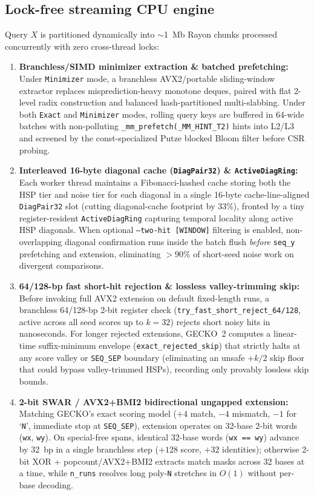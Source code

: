 \documentclass[pdflatex,sn-vancouver,Numbered]{sn-jnl}
\begin{document}
\subsection{Lock-free streaming CPU engine}\label{subsec:cpu}

Query $X$ is partitioned dynamically into $\sim$1~Mb Rayon chunks processed concurrently with zero cross-thread locks:
\begin{enumerate}
    \item \textbf{Branchless/SIMD minimizer extraction \& batched prefetching:} Under \texttt{Minimizer} mode, a branchless AVX2/portable sliding-window extractor replaces misprediction-heavy monotone deques, paired with flat 2-level radix construction and balanced hash-partitioned multi-slabbing. Under both \texttt{Exact} and \texttt{Minimizer} modes, rolling query keys are buffered in 64-wide batches with non-polluting \texttt{\_mm\_prefetch(\_MM\_HINT\_T2)} hints into L2/L3 and screened by the const-specialized Putze blocked Bloom filter before CSR probing.
    \item \textbf{Interleaved 16-byte diagonal cache (\texttt{DiagPair32}) \& \texttt{ActiveDiagRing}:} Each worker thread maintains a Fibonacci-hashed cache storing both the HSP tier and noise tier for each diagonal in a single 16-byte cache-line-aligned \texttt{DiagPair32} slot (cutting diagonal-cache footprint by 33\%), fronted by a tiny register-resident \texttt{ActiveDiagRing} capturing temporal locality along active HSP diagonals. When optional \texttt{--two-hit [WINDOW]} filtering \cite{altschul1997gappedblast} is enabled, non-overlapping diagonal confirmation runs inside the batch flush \emph{before} \texttt{seq\_y} prefetching and extension, eliminating $>90\%$ of short-seed noise work on divergent comparisons.
    \item \textbf{64/128-bp fast short-hit rejection \& lossless valley-trimming skip:} Before invoking full AVX2 extension on default fixed-length runs, a branchless 64/128-bp 2-bit register check (\texttt{try\_fast\_short\_reject\_64/128}, active across all seed scores up to $k=32$) rejects short noisy hits in nanoseconds. For longer rejected extensions, GECKO~2 computes a linear-time suffix-minimum envelope (\texttt{exact\_rejected\_skip}) that strictly halts at any score valley or \texttt{SEQ\_SEP} boundary (eliminating an unsafe $+k/2$ skip floor that could bypass valley-trimmed HSPs), recording only provably lossless skip bounds.
    \item \textbf{2-bit SWAR / AVX2+BMI2 bidirectional ungapped extension:} Matching GECKO's exact scoring model ($+4$ match, $-4$ mismatch, $-1$ for `\texttt{N}', immediate stop at \texttt{SEQ\_SEP}), extension operates on 32-base 2-bit words (\texttt{wx}, \texttt{wy}). On special-free spans, identical 32-base words (\texttt{wx == wy}) advance by 32~bp in a single branchless step ($+128$ score, $+32$ identities); otherwise 2-bit XOR + popcount/AVX2+BMI2 extracts match masks across 32 bases at a time, while \texttt{n\_runs} resolves long poly-\texttt{N} stretches in $O(1)$ without per-base decoding.
\end{enumerate}
\end{document}
